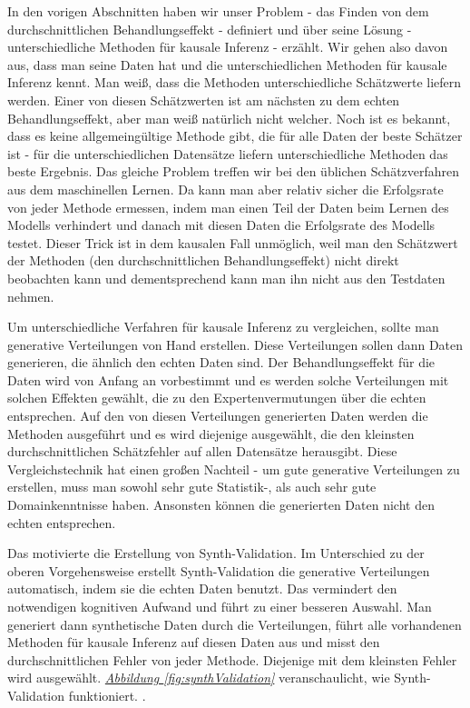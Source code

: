 \documentclass[12pt,a4paper,twoside]{scrartcl}
\numberwithin{equation}{section}
\newcommand{\reffig}[1]{\emph{\hyperref[#1]{Abbildung \ref*{#1}}}}
\begin{document}
In den vorigen Abschnitten haben wir unser Problem - das Finden von dem durchschnittlichen Behandlungseffekt - definiert und über seine Lösung - unterschiedliche Methoden für kausale Inferenz - erzählt. Wir gehen also davon aus, dass man seine Daten hat und die unterschiedlichen Methoden für kausale Inferenz kennt. Man weiß, dass die Methoden unterschiedliche Schätzwerte liefern werden. Einer von diesen Schätzwerten ist am nächsten zu dem echten Behandlungseffekt, aber man weiß natürlich nicht welcher. Noch ist es bekannt, dass es keine allgemeingültige Methode gibt, die für alle Daten der beste Schätzer ist - für die unterschiedlichen Datensätze liefern unterschiedliche Methoden das beste Ergebnis. Das gleiche Problem treffen wir bei den üblichen Schätzverfahren aus dem maschinellen Lernen. Da kann man aber relativ sicher die Erfolgsrate von  jeder Methode ermessen, indem man einen Teil der Daten beim Lernen des Modells verhindert und danach mit diesen Daten die Erfolgsrate des Modells testet. Dieser Trick ist in dem kausalen Fall unmöglich, weil man den Schätzwert der Methoden (den durchschnittlichen Behandlungseffekt) nicht direkt beobachten kann und dementsprechend kann man ihn nicht aus den Testdaten nehmen\cite{schuler2017synth}.\par

\noindent
Um unterschiedliche Verfahren für kausale Inferenz zu vergleichen, sollte man generative Verteilungen von Hand erstellen. Diese Verteilungen sollen dann Daten generieren, die ähnlich den echten Daten sind. Der Behandlungseffekt für die Daten wird von Anfang an vorbestimmt und es werden solche Verteilungen mit solchen Effekten gewählt, die zu den Expertenvermutungen über die echten entsprechen. Auf den von diesen Verteilungen generierten Daten werden die Methoden ausgeführt und es wird diejenige ausgewählt, die den kleinsten durchschnittlichen Schätzfehler auf  allen Datensätze herausgibt. Diese Vergleichstechnik hat einen großen Nachteil - um gute generative Verteilungen zu erstellen, muss man sowohl sehr gute Statistik-, als auch sehr gute Domainkenntnisse haben. Ansonsten können die generierten Daten nicht den echten entsprechen\cite{schuler2017synth}.\par 

\noindent
Das motivierte die Erstellung von Synth-Validation. Im Unterschied zu der oberen Vorgehensweise erstellt Synth-Validation die generative Verteilungen automatisch, indem sie die echten Daten benutzt. Das vermindert den notwendigen kognitiven Aufwand und führt zu einer besseren Auswahl. Man generiert dann synthetische Daten durch die Verteilungen, führt alle vorhandenen Methoden für kausale Inferenz auf diesen Daten aus und misst den durchschnittlichen Fehler von jeder Methode. Diejenige mit dem kleinsten Fehler wird ausgewählt. \reffig{fig:synthValidation} veranschaulicht, wie Synth-Validation funktioniert. \cite{schuler2017synth}.\par 
\end{document}
